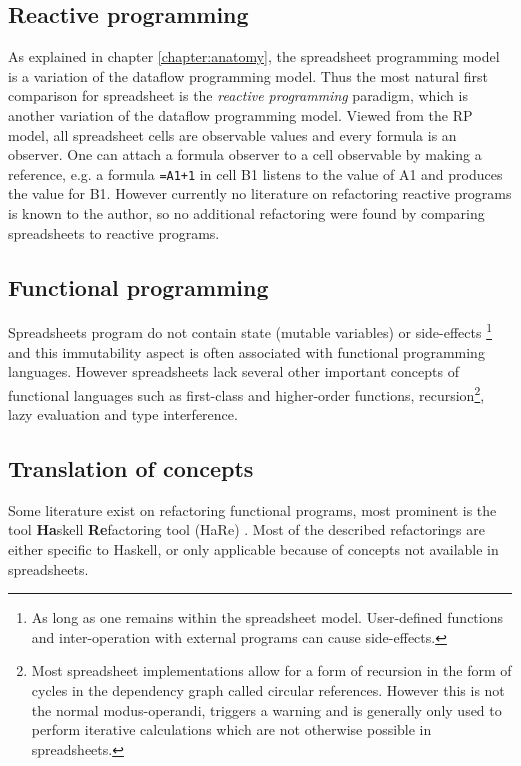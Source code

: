 \documentclass[12pt,a4paper,onecolumn,oneside,parskip]{memoir}
\newcommand{\f}[1]{\texttt{#1}}
\begin{document}
\subsection{Reactive programming}
As explained in chapter \ref{chapter:anatomy}, the spreadsheet programming model is a variation of the dataflow programming model.
Thus the most natural first comparison for spreadsheet is the \emph{reactive programming} paradigm, which is another variation of the dataflow programming model.
Viewed from the RP model, all spreadsheet cells are observable values and every formula is an observer.
One can attach a formula observer to a cell observable by making a reference, e.g. a formula \f{=A1+1} in cell B1 listens to the value of A1 and produces the value for B1.
However currently no literature on refactoring reactive programs is known to the author, so no additional refactoring were found by comparing spreadsheets to reactive programs.

\subsection{Functional programming}
Spreadsheets program do not contain state (mutable variables) or side-effects
\footnote{As long as one remains within the spreadsheet model. User-defined functions and inter-operation with external programs can cause side-effects.}
and this immutability aspect is often associated with functional programming languages.
However spreadsheets lack several other important concepts of functional languages such as first-class and higher-order functions, recursion\footnote{Most spreadsheet implementations allow for a form of recursion in the form of cycles in the dependency graph called circular references. However this is not the normal modus-operandi, triggers a warning and is generally only used to perform iterative calculations which are not otherwise possible in spreadsheets.}, lazy evaluation and type interference.

\subsection{Translation of concepts}

Some literature exist on refactoring functional programs, most prominent is the tool \textbf{Ha}skell \textbf{Re}factoring tool (HaRe) \cite{thompson2005refactoring}.
Most of the described refactorings are either specific to Haskell, or only applicable because of concepts not available in spreadsheets.
\end{document}
